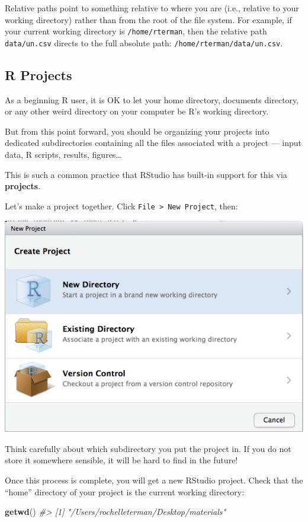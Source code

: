 \documentclass[]{book}
\newenvironment{Shaded}{\begin{snugshade}}{\end{snugshade}}
\newcommand{\KeywordTok}[1]{\textcolor[rgb]{0.13,0.29,0.53}{\textbf{#1}}}
\newcommand{\CommentTok}[1]{\textcolor[rgb]{0.56,0.35,0.01}{\textit{#1}}}
\newcommand{\NormalTok}[1]{#1}
\begin{document}
Relative paths point to something relative to where you are (i.e.,
relative to your working directory) rather than from the root of the
file system. For example, if your current working directory is
\texttt{/home/rterman}, then the relative path \texttt{data/un.csv}
directs to the full absolute path: \texttt{/home/rterman/data/un.csv}.

\subsection{R Projects}\label{r-projects}

As a beginning R user, it is OK to let your home directory, documents
directory, or any other weird directory on your computer be R's working
directory.

But from this point forward, you should be organizing your projects into
dedicated subdirectories containing all the files associated with a
project --- input data, R scripts, results, figures\ldots{}

This is such a common practice that RStudio has built-in support for
this via \textbf{projects}.

Let's make a project together. Click
\texttt{File\ \textgreater{}\ New\ Project}, then:

\begin{center}\includegraphics[width=0.7\linewidth]{img/rstudio-project-1} \end{center}

Think carefully about which subdirectory you put the project in. If you
do not store it somewhere sensible, it will be hard to find in the
future!

Once this process is complete, you will get a new RStudio project. Check
that the ``home'' directory of your project is the current working
directory:

\begin{Shaded}
\begin{Highlighting}[]
\KeywordTok{getwd}\NormalTok{()}
\CommentTok{#> [1] "/Users/rochelleterman/Desktop/materials"}
\end{Highlighting}
\end{Shaded}
\end{document}

